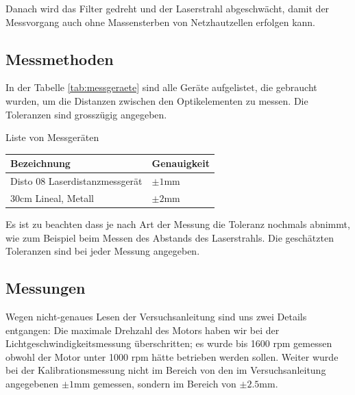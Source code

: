 Danach  wird  das  Filter  gedreht und der Laserstrahl abgeschw\"acht, damit der
Messvorgang   auch   ohne   Massensterben   von  Netzhautzellen  erfolgen  kann.


\subsection{Messmethoden}

In  der  Tabelle  \ref{tab:messgeraete}  sind  alle  Ger\"ate  aufgelistet,  die
gebraucht  wurden,  um  die Distanzen zwischen den Optikelementen zu messen. Die
Toleranzen  sind grossz\"ugig angegeben.

\begin{center}
    \begin{threeparttable}
        \caption{Liste von Messger\"aten}
        \label{tab:messgeraete}
        \begin{tabular}{ll}
            \toprule
            Bezeichnung                         & Genauigkeit \\
            \midrule
            Disto 08 Laserdistanzmessger\"at    & $\pm1\textrm{mm}$ \\
            $30\textrm{cm}$ Lineal, Metall      & $\pm2\textrm{mm}$ \\
            \bottomrule
        \end{tabular}
    \end{threeparttable}
\end{center}

Es ist zu beachten dass je nach Art der
Messung die Toleranz nochmals abnimmt, wie zum Beispiel beim Messen des Abstands
des Laserstrahls. Die gesch\"atzten Toleranzen sind bei jeder Messung angegeben.


\subsection{Messungen}

Wegen nicht-genaues Lesen der Versuchsanleitung sind uns zwei Details entgangen:
Die  maximale Drehzahl des Motors haben wir bei der Lichtgeschwindigkeitsmessung
\"uberschritten;  es wurde bis 1600 rpm gemessen obwohl der Motor unter 1000 rpm
h\"atte  betrieben werden sollen. Weiter wurde bei der Kalibrationsmessung nicht
im  Bereich von den im Versuchsanleitung angegebenen $\pm1\textrm{mm}$ gemessen,
sondern im Bereich von $\pm2.5\textrm{mm}$.

